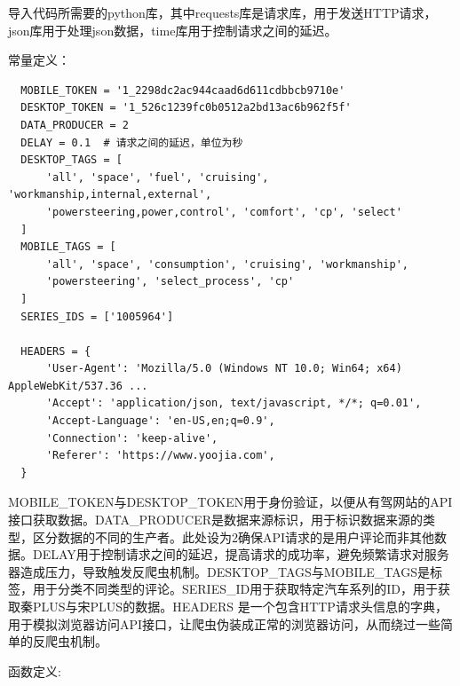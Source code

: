 \documentclass[UTF8,a4paper,15pt,titlepage,oneside]{ctexbook}
\begin{document}
  导入代码所需要的python库，其中requests库是请求库，用于发送HTTP请求，json库用于处理json数据，time库用于控制请求之间的延迟。

  常量定义：

  \begin{mdframed}[backgroundcolor=darkgray, linecolor=lightgray, linewidth=1pt, innermargin=0.5cm, outermargin=0.5cm, skipbelow=0.1cm]
    \color{white}
    \begin{verbatim}
  MOBILE_TOKEN = '1_2298dc2ac944caad6d611cdbbcb9710e'
  DESKTOP_TOKEN = '1_526c1239fc0b0512a2bd13ac6b962f5f'
  DATA_PRODUCER = 2
  DELAY = 0.1  # 请求之间的延迟，单位为秒
  DESKTOP_TAGS = [
      'all', 'space', 'fuel', 'cruising', 'workmanship,internal,external',
      'powersteering,power,control', 'comfort', 'cp', 'select'
  ]
  MOBILE_TAGS = [
      'all', 'space', 'consumption', 'cruising', 'workmanship',
      'powersteering', 'select_process', 'cp'
  ]
  SERIES_IDS = ['1005964']
  
  HEADERS = {
      'User-Agent': 'Mozilla/5.0 (Windows NT 10.0; Win64; x64) AppleWebKit/537.36 ...
      'Accept': 'application/json, text/javascript, */*; q=0.01',
      'Accept-Language': 'en-US,en;q=0.9',
      'Connection': 'keep-alive',
      'Referer': 'https://www.yoojia.com',
  }   
    \end{verbatim}
    \vspace{-1.5em} %
    \end{mdframed}

    MOBILE\_TOKEN与DESKTOP\_TOKEN用于身份验证，以便从有驾网站的API接口获取数据。DATA\_PRODUCER是数据来源标识，用于标识数据来源的类型，区分数据的不同的生产者。此处设为2确保API请求的是用户评论而非其他数据。DELAY用于控制请求之间的延迟，提高请求的成功率，避免频繁请求对服务器造成压力，导致触发反爬虫机制。DESKTOP\_TAGS与MOBILE\_TAGS是标签，用于分类不同类型的评论。SERIES\_ID用于获取特定汽车系列的ID，用于获取秦PLUS与宋PLUS的数据。HEADERS 是一个包含HTTP请求头信息的字典，用于模拟浏览器访问API接口，让爬虫伪装成正常的浏览器访问，从而绕过一些简单的反爬虫机制。


    函数定义:
\end{document}

